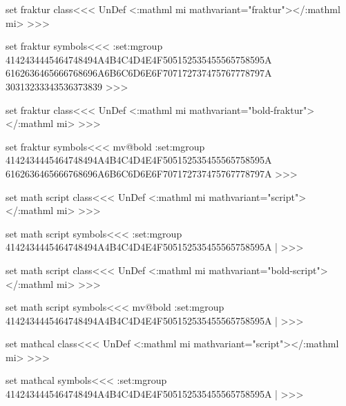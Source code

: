 \<set fraktur class\><<<
\ifx \mathfrakMathClass\:UnDef
  \NewMathClass\mathfrakMathClass
\fi
{}
    {<\a:mathml mi\Hnewline 
         mathvariant="fraktur">}{</\a:mathml mi>}{}  
>>>

\<set fraktur symbols\><<<
\find:set:mgroup{}{\mathfrakMathClass}%
  {4142434445464748494A4B4C4D4E4F505152535455565758595A%
   6162636465666768696A6B6C6D6E6F707172737475767778797A%
   30313233343536373839}%
>>>



\<set fraktur class\><<<
\ifx \mathboldfrakMathClass\:UnDef
  \NewMathClass\mathboldfrakMathClass
\fi
{}
    {<\a:mathml mi\Hnewline 
         mathvariant="bold-fraktur">}{</\a:mathml mi>}{}  
>>>

\<set fraktur symbols\><<<
\expandafter\ifx\csname mv@bold\endcsname\relax  \else
\bgroup
{}%
\find:set:mgroup{}{\mathboldfrakMathClass}%
  {4142434445464748494A4B4C4D4E4F505152535455565758595A%
   6162636465666768696A6B6C6D6E6F707172737475767778797A%
  }%
\egroup
\fi
>>>



\<set math script class\><<<
\ifx \mathscrMathClass\:UnDef
  \NewMathClass\mathscrMathClass
\fi
{}
    {<\a:mathml mi\Hnewline
         mathvariant="script">}{</\a:mathml mi>}{}  
>>>

\<set math script symbols\><<<
\find:set:mgroup{}{\mathscrMathClass}%
  {4142434445464748494A4B4C4D4E4F505152535455565758595A} |%
>>>

\<set math script class\><<<
\ifx \mathboldscrMathClass\:UnDef
  \NewMathClass\mathboldscrMathClass
\fi
{}
    {<\a:mathml mi\Hnewline
         mathvariant="bold-script">}{</\a:mathml mi>}{}  
>>>

\<set math script symbols\><<<
\expandafter\ifx\csname mv@bold\endcsname\relax  \else
\bgroup
{}%
\find:set:mgroup{}{\mathboldscrMathClass}%
  {4142434445464748494A4B4C4D4E4F505152535455565758595A} |%
\egroup
\fi
>>>

\<set mathcal class\><<<
\ifx \mathcalMathClass\:UnDef
  \NewMathClass\mathcalMathClass
\fi
{}
    {<\a:mathml mi\Hnewline
         mathvariant="script">}{</\a:mathml mi>}{}  
>>>

\<set mathcal symbols\><<<
\find:set:mgroup{}{\mathcalMathClass}%
  {4142434445464748494A4B4C4D4E4F505152535455565758595A} |%
>>>

